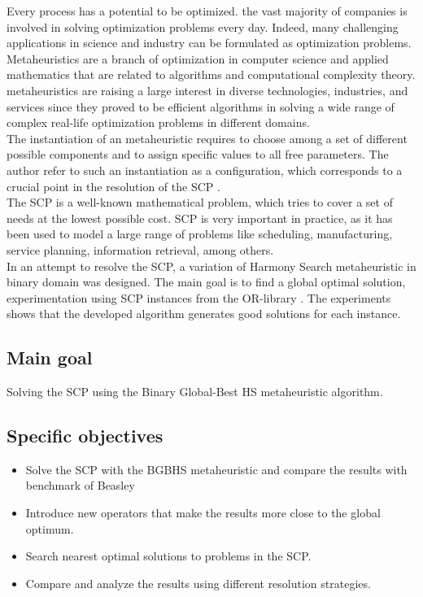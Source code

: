 Every process has a potential to be optimized. the vast majority of companies is involved in solving optimization problems every day. Indeed, many challenging applications in science and industry can be formulated as optimization problems.\\

Metaheuristics are a branch of optimization in computer science and applied mathematics that are related to algorithms and computational complexity theory. metaheuristics are raising a large interest in diverse technologies, industries, and services since they proved to be efficient algorithms in solving a wide range of  complex real-life optimization problems in different domains.\\

The instantiation of an metaheuristic requires to choose among a set of different possible components and to assign specific values to all free parameters. The author refer to such an instantiation as a configuration, which corresponds to a crucial point in the resolution of the SCP \cite{DBLP:conf/gecco/BirattariSPV02}.\\

The SCP is a well-known mathematical problem, which tries to cover a set of needs at the lowest possible cost. SCP is very important in practice, as it has been used to model a large range of problems like scheduling, manufacturing, service planning, information retrieval, among others.\\

In an attempt to resolve the SCP, a variation of Harmony Search metaheuristic in binary domain  was designed. The main goal is to find a global optimal solution, experimentation using SCP instances from the OR-library \cite{citeulike:921349}. The experiments shows that the developed algorithm generates good solutions for each instance.

\subsection{Main goal}
Solving the SCP using the Binary Global-Best HS metaheuristic algorithm. 

\subsection{Specific objectives}
\begin{itemize}
\item Solve the SCP with the BGBHS metaheuristic and compare the results with benchmark of Beasley	
\item Introduce new operators that make the results more close to the global optimum.
\item Search nearest optimal solutions to problems in the SCP.
\item Compare and analyze the results using different resolution strategies.
\end{itemize}


